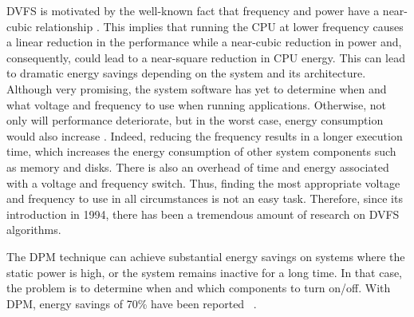 \documentclass{ieeeaccess}
\begin{document}
DVFS is motivated by the well-known fact that frequency and power have a near-cubic relationship \cite{Dayarathna2016DataSurvey, Group2012HandbookSahni}. 
This implies that running the CPU at lower frequency causes a linear reduction in the performance while a near-cubic reduction in power and, consequently, could lead to a near-square reduction in CPU energy. 
This can lead to dramatic energy savings depending on the system and its architecture.
Although very promising, the system software has yet to determine when and what voltage and frequency to use when running applications.
Otherwise, not only will performance deteriorate, but in the worst case, energy consumption would also increase  \cite{Group2012HandbookSahni}.
Indeed, reducing the frequency results in a longer execution time, which increases the energy consumption of other system components such as memory and disks.
There is also an overhead of time and energy associated with a voltage and frequency switch.
Thus, finding the most appropriate voltage and frequency to use  in all circumstances is not an easy task.
Therefore, since its introduction in 1994, there has been a tremendous amount of research on DVFS algorithms.

The DPM technique can achieve substantial energy savings on systems where the static power is high, or the system remains inactive for a long time.
In that case, the problem is to determine when and which components to turn on/off.
With DPM, energy savings of 70\% have been reported ~\cite{Shuja2012Energy-efficientCenters, Benini2000AManagement}.
\end{document}
